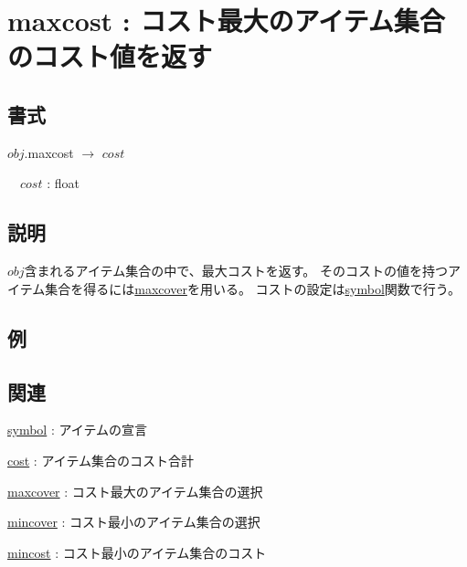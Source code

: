 
\section{maxcost : コスト最大のアイテム集合のコスト値を返す\label{sect:maxcost}}
\subsection*{書式}
$obj$.maxcost $\rightarrow$ $cost$

~~$cost$ : float

\subsection*{説明}
$obj$含まれるアイテム集合の中で、最大コストを返す。
そのコストの値を持つアイテム集合を得るには\hyperref[sect:maxcover]{maxcover}を用いる。
コストの設定は\hyperref[sect:symbol]{symbol}関数で行う。

\subsection*{例}


\subsection*{関連}
\hyperref[sect:symbol]{symbol} : アイテムの宣言

\hyperref[sect:cost]{cost} : アイテム集合のコスト合計

\hyperref[sect:maxcover]{maxcover} : コスト最大のアイテム集合の選択

\hyperref[sect:mincover]{mincover} : コスト最小のアイテム集合の選択

\hyperref[sect:mincost]{mincost} : コスト最小のアイテム集合のコスト


